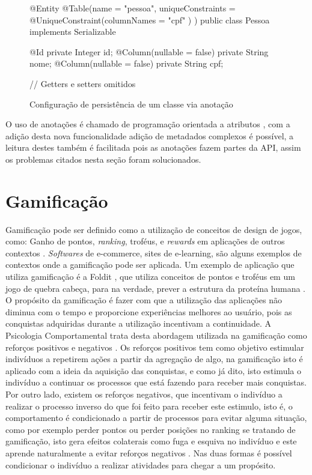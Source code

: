 \begin{figure}[H]
    \centering
    \caption{Configuração de persistência de um classe via anotação}
    \begin{java}
@Entity
@Table(name = "pessoa", uniqueConstraints = { @UniqueConstraint(columnNames = { "cpf" }) 
})
public class Pessoa implements Serializable {

	@Id
	private Integer id;
	@Column(nullable = false)
	private String nome;
	@Column(nullable = false)
	private String cpf;

    // Getters e setters omitidos

}
    \end{java}
    \label{fig:classe-metadado}
\end{figure}

O uso de anotações é chamado de programação orientada a atributos \cite{buschmann2007pattern}, com a adição desta nova funcionalidade adição de metadados complexos é possível, a leitura destes também é facilitada pois as anotações fazem partes da API, assim os problemas citados nesta seção foram solucionados.

\section{Gamificação}

\par Gamificação pode ser definido como a utilização de conceitos de design de jogos, como: Ganho de pontos, \textit{ranking}, troféus, e \textit{rewards} em aplicações de outros contextos \cite{deterding2011gamification}. \textit{Softwares} de e-commerce, sites de e-learning, são alguns exemplos de contextos onde a gamificação pode ser aplicada. Um exemplo de aplicação que utiliza gamificação é a Foldit \cite{burke2012behind}, que utiliza conceitos de pontos e troféus em um jogo de quebra cabeça, para na verdade, prever a estrutura da proteína humana \cite{deterding2011gamification}. O propósito da gamificação é fazer com que a utilização das aplicações não diminua com o tempo e proporcione experiências melhores ao usuário, pois as conquistas adquiridas durante a utilização incentivam a continuidade. A Psicologia Comportamental trata desta abordagem utilizada na gamificação como reforços positivos e negativos \cite{skinner1990behavior}. Os reforços positivos tem como objetivo estimular indivíduos a repetirem ações a partir da agregação de algo, na gamificação isto é aplicado com a ideia da aquisição das conquistas, e como já dito, isto estimula o indivíduo a continuar os processos que está fazendo para receber mais conquistas. Por outro lado, existem os reforços negativos, que incentivam o indivíduo a realizar o processo inverso do que foi feito para receber este estimulo, isto é, o comportamento é condicionado a partir de processos para evitar alguma situação, como por exemplo perder pontos ou perder posições no ranking se tratando de gamificação, isto gera efeitos colaterais como fuga e esquiva no indivíduo e este aprende naturalmente a evitar reforços negativos \cite{linehan2015gamification}. Nas duas formas é possível condicionar o indivíduo a realizar atividades para chegar a um propósito.

